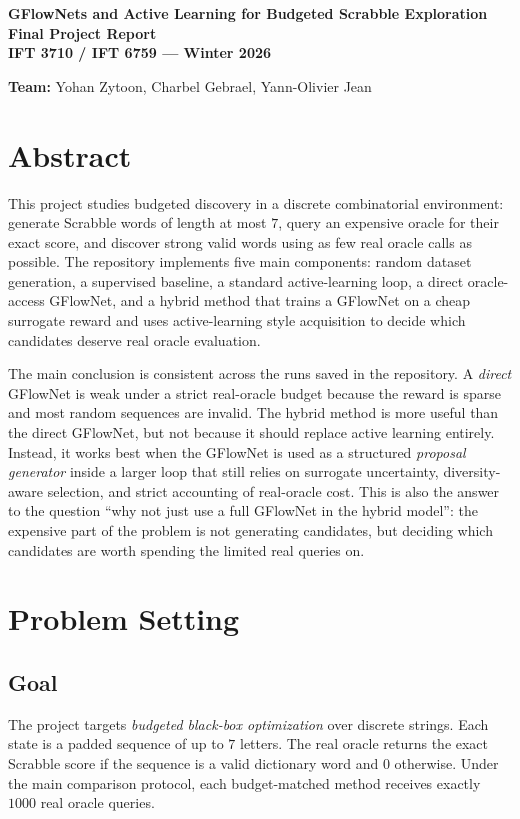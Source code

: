 \documentclass[10pt]{article}
\begin{document}
\begin{center}
    {\Large \textbf{GFlowNets and Active Learning for Budgeted Scrabble Exploration}}\\
    \vspace{0.35em}
    \textbf{Final Project Report}\\
    \textbf{IFT 3710 / IFT 6759 --- Winter 2026}
\end{center}

\textbf{Team:} Yohan Zytoon, Charbel Gebrael, Yann-Olivier Jean

\section{Abstract}
This project studies budgeted discovery in a discrete combinatorial environment: generate Scrabble words of length at most \(7\), query an expensive oracle for their exact score, and discover strong valid words using as few real oracle calls as possible. The repository implements five main components: random dataset generation, a supervised baseline, a standard active-learning loop, a direct oracle-access GFlowNet, and a hybrid method that trains a GFlowNet on a cheap surrogate reward and uses active-learning style acquisition to decide which candidates deserve real oracle evaluation.

The main conclusion is consistent across the runs saved in the repository. A \emph{direct} GFlowNet is weak under a strict real-oracle budget because the reward is sparse and most random sequences are invalid. The hybrid method is more useful than the direct GFlowNet, but not because it should replace active learning entirely. Instead, it works best when the GFlowNet is used as a structured \emph{proposal generator} inside a larger loop that still relies on surrogate uncertainty, diversity-aware selection, and strict accounting of real-oracle cost. This is also the answer to the question ``why not just use a full GFlowNet in the hybrid model'': the expensive part of the problem is not generating candidates, but deciding which candidates are worth spending the limited real queries on.

\section{Problem Setting}
\subsection{Goal}
The project targets \emph{budgeted black-box optimization} over discrete strings. Each state is a padded sequence of up to \(7\) letters. The real oracle returns the exact Scrabble score if the sequence is a valid dictionary word and \(0\) otherwise. Under the main comparison protocol, each budget-matched method receives exactly \(1000\) real oracle queries.
\end{document}
